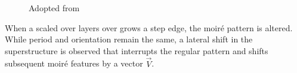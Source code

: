 \begin{figure} \centering
	\caption{Adopted from \cite{hermann_periodic_2012}}
	\label{fig:moire-pattern}
\end{figure}

When a scaled over layers over grows a step edge, the moir\'e pattern is altered. While period and orientation remain the same, a lateral shift in the superstructure is observed that interrupts the regular pattern and shifts subsequent moir\'e features by a vector $\vec{V}$.

